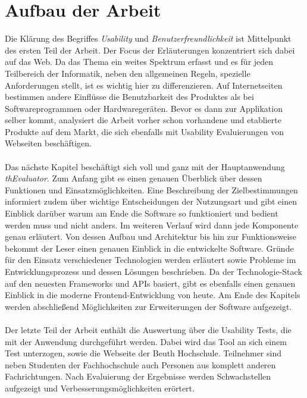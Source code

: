 %
%
%
%

\section{Aufbau der Arbeit}

Die Klärung des Begriffes \textit{Usability} und \textit{Benutzerfreundlichkeit} ist Mittelpunkt des ersten Teil der Arbeit. Der Focus der Erläuterungen konzentriert sich dabei auf das Web. Da das Thema ein weites Spektrum erfasst und es für jeden Teilbereich der Informatik, neben den allgemeinen Regeln, spezielle Anforderungen stellt, ist es wichtig hier zu differenzieren. Auf Internetseiten bestimmen andere Einflüsse die Benutzbarkeit des Produktes als bei Softwareprogrammen oder Hardwaregeräten. Bevor es dann zur Applikation selber kommt, analysiert die Arbeit vorher schon vorhandene und etablierte Produkte auf dem Markt, die sich ebenfalls mit Usability Evaluierungen von Webseiten beschäftigen.\\
\\
Das nächste Kapitel beschäftigt sich voll und ganz mit der Hauptanwendung \textit{thEvaluator}. Zum Anfang gibt es einen genauen Überblick über dessen Funktionen und Einsatzmöglichkeiten. Eine Beschreibung der Zielbestimmungen informiert zudem über wichtige Entscheidungen der Nutzungsart und gibt einen Einblick darüber warum am Ende die Software so funktioniert und bedient werden muss und nicht anders. Im weiteren Verlauf wird dann jede Komponente genau erläutert. Von dessen Aufbau und Architektur bis hin zur Funktionsweise bekommt der Leser einen genauen Einblick in die entwickelte Software. Gründe für den Einsatz verschiedener Technologien werden erläutert sowie Probleme im Entwicklungsprozess und dessen Lösungen beschrieben. Da der Technologie-Stack auf den neuesten Frameworks und APIs basiert, gibt es ebenfalls einen genauen Einblick in die moderne Frontend-Entwicklung von heute. Am Ende des Kapitels werden abschließend Möglichkeiten zur Erweiterungen der Software aufgezeigt.\\
\\
Der letzte Teil der Arbeit enthält die Auswertung über die Usability Tests, die mit der Anwendung durchgeführt werden. Dabei wird das Tool an sich einem Test unterzogen, sowie die Webseite der Beuth Hochschule. Teilnehmer sind neben Studenten der Fachhochschule auch Personen aus komplett anderen Fachrichtungen. Nach Evaluierung der Ergebnisse werden Schwachstellen aufgezeigt und Verbesserungsmöglichkeiten erörtert.